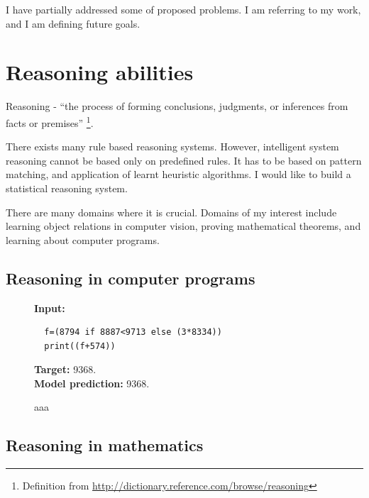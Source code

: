\documentclass{article}
\begin{document}
I have partially addressed some of proposed problems. I am referring to my work, and I am defining future goals.




\section{Reasoning abilities}

Reasoning - ``the process of forming conclusions, judgments, or inferences from facts or 
premises'' \footnote{Definition from \url{http://dictionary.reference.com/browse/reasoning}}.







There exists many rule based reasoning systems. 
However, intelligent system reasoning cannot be based only on predefined rules. 
It has to be based on pattern matching, and application of learnt heuristic algorithms. 
I would like to build a statistical reasoning system. 


There are many domains where it is crucial. Domains of my interest include learning object relations in computer vision, proving mathematical theorems, and learning about computer programs.

\subsection{Reasoning in computer programs}

\begin{figure}
  \begin{code}
  \begin{mdframed}
  {\bf Input:}
  \begin{lstlisting}
  f=(8794 if 8887<9713 else (3*8334))
  print((f+574))
  \end{lstlisting} 
  {\bf Target:} 9368. \\
  {\bf Model prediction:} 9368. 
  \end{mdframed}
  \end{code}
  \caption{aaa}
\end{figure}



\subsection{Reasoning in mathematics}
\end{document}
